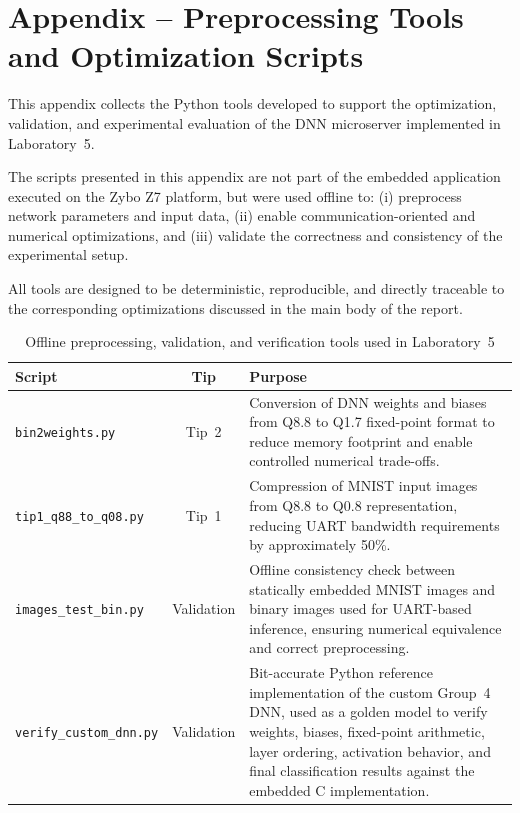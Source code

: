 \chapter{Appendix – Preprocessing Tools and Optimization Scripts}
\label{chap:appendix}

This appendix collects the Python tools developed to support the optimization,
validation, and experimental evaluation of the DNN microserver implemented in
Laboratory~5.

The scripts presented in this appendix are not part of the embedded application
executed on the Zybo Z7 platform, but were used offline to:
(i) preprocess network parameters and input data,
(ii) enable communication-oriented and numerical optimizations,
and (iii) validate the correctness and consistency of the experimental setup.

All tools are designed to be deterministic, reproducible, and directly traceable
to the corresponding optimizations discussed in the main body of the report.
\begin{table}[H]
\centering
\caption{Offline preprocessing, validation, and verification tools used in Laboratory~5}
\label{tab:appendix_tools}
\renewcommand{\arraystretch}{1.2}
\begin{tabular}{|l|c|p{7cm}|}
\hline
\textbf{Script} & \textbf{Tip} & \textbf{Purpose} \\
\hline
\texttt{bin2weights.py} &
Tip~2 &
Conversion of DNN weights and biases from Q8.8 to Q1.7 fixed-point format to reduce
memory footprint and enable controlled numerical trade-offs. \\
\hline
\texttt{tip1\_q88\_to\_q08.py} &
Tip~1 &
Compression of MNIST input images from Q8.8 to Q0.8 representation, reducing UART
bandwidth requirements by approximately 50\%. \\
\hline
\texttt{images\_test\_bin.py} &
Validation &
Offline consistency check between statically embedded MNIST images and binary
images used for UART-based inference, ensuring numerical equivalence and correct
preprocessing. \\
\hline
\texttt{verify\_custom\_dnn.py} &
Validation &
Bit-accurate Python reference implementation of the custom Group~4 DNN, used as
a golden model to verify weights, biases, fixed-point arithmetic, layer ordering,
activation behavior, and final classification results against the embedded C
implementation. \\
\hline
\end{tabular}
\end{table}



